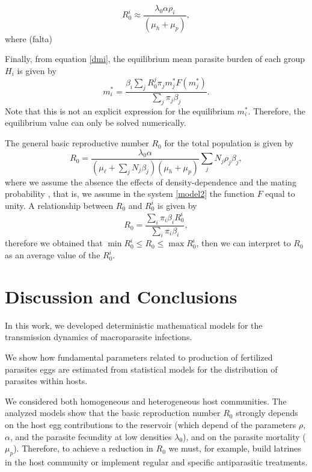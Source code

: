 \documentclass[eng]{MMSB-class-eng}
\begin{document}
{{\begin{equation}
R_0^i\approx \frac{ \lambda_0 \alpha  \rho_i }{ (\mu_h + \mu_p) },  
\end{equation}
where {\color{blue}(falta)}

Finally, from equation \eqref{dmi},  the equilibrium mean parasite burden of each group $H_{i}$ is given by
\begin{equation}
m_{i}^*=\frac{\beta_{i}\sum_jR_0^j\pi_jm_j^* F(m_j^*)}{ \sum_j \pi_j\beta_{j}}.
\end{equation}
Note that this is not an explicit expression for the equilibrium $m_{i}^*$. Therefore, the equilibrium value can only be solved numerically.
}

The general basic reproductive number $R_0$ for the total population is given by %
\begin{equation}\label{valorR0}
R_{0}=\frac{\lambda_0 \alpha }
{ (\mu_{\ell}+\sum_j N_j \beta_j  )(\mu_{h}+\mu_p)}
\sum_j N_j \rho_{j} \beta_{j},   
\end{equation}
where we assume the absence the effects of density-dependence and the mating probability \citep{anderson1992infectious}, that is, we assume in the system \eqref{model2} the function $F$ equal to unity.
A relationship between $R_0$ and $R_0^i$ is given by
\begin{equation}
R_{0}=\frac{\sum_i \pi_i\beta_{i}R_0^i}
{\sum_i \pi_i \beta_{i}},   
\end{equation}
therefore we obtained that $\min R_0^i\leq R_0 \leq \max R_0^i$, 
then we can interpret to $R_0$ as an average value of the $R_0^i$.


\section{Discussion and Conclusions}

In this work, we developed deterministic mathematical models for the transmission dynamics of macroparasite infections. 

We show how fundamental parameters related to production of fertilized parasites eggs are estimated from statistical models for the distribution of
parasites within hosts.	

We considered both homogeneous and heterogeneous host communities. 
The analyzed models show that the basic reproduction number $R_0$ strongly depends 
on the
host egg contributions to the reservoir (which depend of the parameters $\rho$, $\alpha$, and the parasite fecundity at low densities $\lambda_0 $), and on the parasite mortality ($\mu_p$). 
Therefore, to achieve a reduction in $R_0$ we must, for example, build latrines in the host community or implement regular and specific antiparasitic treatments.

}
\end{document}

